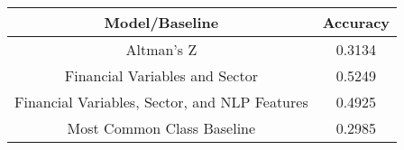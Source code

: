 \footnotesize
\begin{tabular}{cc}
\toprule
Model/Baseline & Accuracy \\
\midrule
Altman's Z & 0.3134 \\
Financial Variables and Sector & 0.5249 \\
Financial Variables, Sector, and NLP Features & 0.4925 \\
Most Common Class Baseline & 0.2985 \\
\bottomrule
\end{tabular}

\normalsize